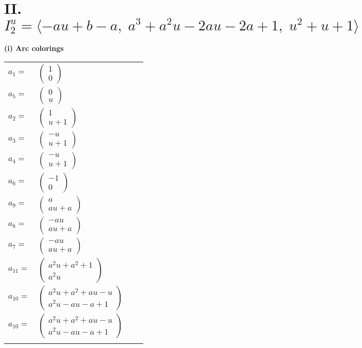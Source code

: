 \documentclass[1p]{elsarticle_modified}
\theoremstyle{definition}
\begin{document}
\centering \section*{II. $I^u_{2}= \langle - a u+b- a,\;a^3+a^2 u-2 a u-2 a+1,\;u^2+u+1 \rangle$}
\flushleft \textbf{(i) Arc colorings}\\
\begin{tabular}{m{7pt} m{180pt} m{7pt} m{180pt} }
\flushright $a_{1}=$&$\begin{pmatrix}1\\0\end{pmatrix}$ \\
\flushright $a_{5}=$&$\begin{pmatrix}0\\u\end{pmatrix}$ \\
\flushright $a_{2}=$&$\begin{pmatrix}1\\u+1\end{pmatrix}$ \\
\flushright $a_{3}=$&$\begin{pmatrix}- u\\u+1\end{pmatrix}$ \\
\flushright $a_{4}=$&$\begin{pmatrix}- u\\u+1\end{pmatrix}$ \\
\flushright $a_{6}=$&$\begin{pmatrix}-1\\0\end{pmatrix}$ \\
\flushright $a_{9}=$&$\begin{pmatrix}a\\a u+a\end{pmatrix}$ \\
\flushright $a_{8}=$&$\begin{pmatrix}- a u\\a u+a\end{pmatrix}$ \\
\flushright $a_{7}=$&$\begin{pmatrix}- a u\\a u+a\end{pmatrix}$ \\
\flushright $a_{11}=$&$\begin{pmatrix}a^2 u+a^2+1\\a^2 u\end{pmatrix}$ \\
\flushright $a_{10}=$&$\begin{pmatrix}a^2 u+a^2+a u- u\\a^2 u- a u- a+1\end{pmatrix}$\\ \flushright $a_{10}=$&$\begin{pmatrix}a^2 u+a^2+a u- u\\a^2 u- a u- a+1\end{pmatrix}$\\&\end{tabular}
\end{document}
